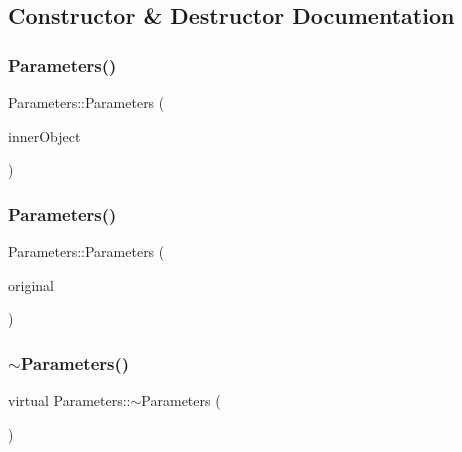 \subsection{Constructor \& Destructor Documentation}
\hypertarget{classParameters_a82a97d8393103fecb5458fc2d98efbb4}{}\label{classParameters_a82a97d8393103fecb5458fc2d98efbb4} 
\subsubsection{\texorpdfstring{Parameters()}{Parameters()}\hspace{0.1cm}{\footnotesize\ttfamily [1/2]}}
{\footnotesize\ttfamily Parameters\+::\+Parameters (\begin{DoxyParamCaption}\item[{const \hyperlink{classParametersInner}{Parameters\+Inner} \&}]{inner\+Object }\end{DoxyParamCaption})}

\hypertarget{classParameters_a6b26309ae0375b719bd2493a6fff7e81}{}\label{classParameters_a6b26309ae0375b719bd2493a6fff7e81} 
\subsubsection{\texorpdfstring{Parameters()}{Parameters()}\hspace{0.1cm}{\footnotesize\ttfamily [2/2]}}
{\footnotesize\ttfamily Parameters\+::\+Parameters (\begin{DoxyParamCaption}\item[{const \hyperlink{classParameters}{Parameters} \&}]{original }\end{DoxyParamCaption})}

\hypertarget{classParameters_ab63bff39f72bf70a634b8c943dd19136}{}\label{classParameters_ab63bff39f72bf70a634b8c943dd19136} 
\subsubsection{\texorpdfstring{$\sim$\+Parameters()}{~Parameters()}}
{\footnotesize\ttfamily virtual Parameters\+::$\sim$\+Parameters (\begin{DoxyParamCaption}{ }\end{DoxyParamCaption})\hspace{0.3cm}{\ttfamily [virtual]}}



